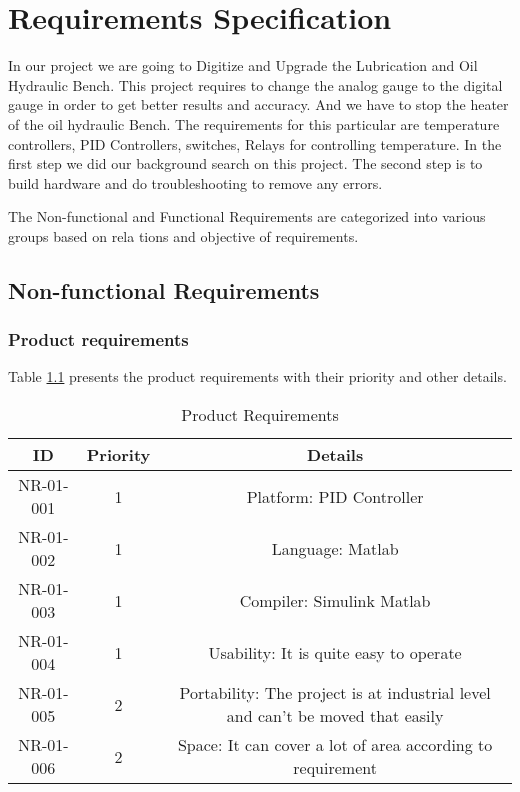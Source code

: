 \documentclass[14pt]{report}
\begin{document}
\chapter{\textbf{Requirements Specification}}

In our project we are going to Digitize and Upgrade the Lubrication and Oil Hydraulic Bench. This project
requires to change the analog gauge to the digital gauge in order to get better results and accuracy. And
we have to stop the heater of the oil hydraulic Bench. The requirements for this particular are temperature
controllers, PID Controllers, switches, Relays for controlling temperature. In the ﬁrst step we did our
background search on this project. The second step is to build hardware and do troubleshooting to
remove any errors.

The Non-functional and Functional Requirements are categorized into various groups based on rela
tions and objective of requirements.

\section{\textbf{Non-functional Requirements}}

\subsection{\textbf{Product requirements}}

Table \ref{table:3.1} presents the product requirements with their priority and other details.

\begin{table}[H]
\begin{center}
\begin{tabular}{| c | c | c | }
\hline
 ID & Priority & Details \\ 
\hline
 NR-01-001 & 1 & Platform: PID Controller \\  
\hline
 NR-01-002 & 1 & Language: Matlab \\
\hline
NR-01-003 & 1 &Compiler: Simulink Matlab \\  
\hline
NR-01-004 & 1 & Usability: It is quite easy to operate \\  
\hline
NR-01-005 & 2 & Portability: The project is at industrial level and can’t be moved
that easily \\  
\hline
NR-01-006 & 2 & Space: It can cover a lot of area according to requirement \\     
\hline
\end{tabular}
\end{center}
\caption{Product Requirements}
\label{table:3.1}
\end{table}
\end{document}
